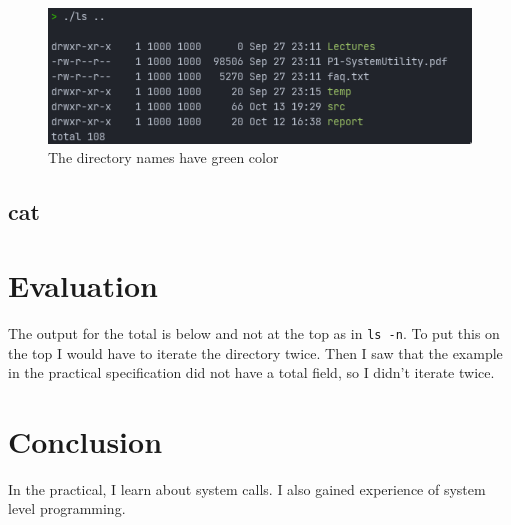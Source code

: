 \documentclass[11pt]{article}
\begin{document}
\begin{figure}[htbp]
\centering
\includegraphics[width=.9\linewidth]{./color-ls.png}
\caption{\label{colorls}The directory names have green color}
\end{figure}

\subsection{cat}
\label{sec:orgb43725e}


\section{Evaluation}
\label{sec:org1a8bc69}
The output for the total is below and not at the top as in \texttt{ls -n}. To put this on the top I would have to iterate the directory twice. Then I saw that the example in the practical specification did not have a total field, so I didn't iterate twice.

\section{Conclusion}
\label{sec:org1dbe88c}
In the practical, I learn about system calls. I also gained experience of system level programming.
\end{document}
